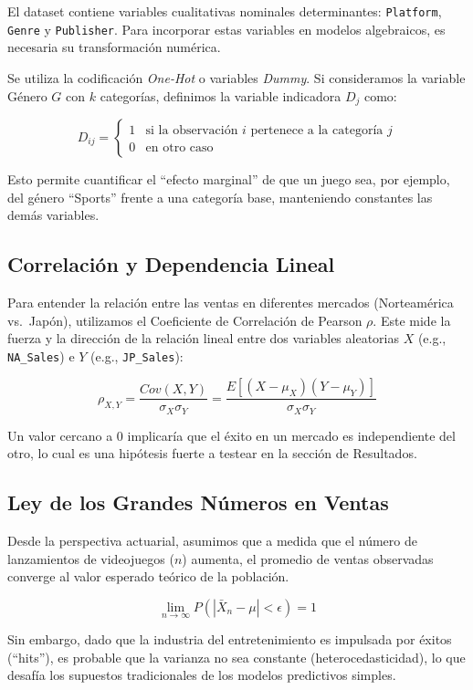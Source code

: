 \documentclass[oneside,11pt]{Latex/Classes/PhDthesisPSnPDF}
\begin{document}
El dataset contiene variables cualitativas nominales determinantes:
\texttt{Platform}, \texttt{Genre} y \texttt{Publisher}. Para incorporar
estas variables en modelos algebraicos, es necesaria su transformación
numérica.

Se utiliza la codificación \emph{One-Hot} o variables \emph{Dummy}. Si
consideramos la variable Género \(G\) con \(k\) categorías, definimos la
variable indicadora \(D_j\) como:

\[
D_{ij} = \begin{cases} 
1 & \text{si la observación } i \text{ pertenece a la categoría } j \\
0 & \text{en otro caso}
\end{cases}
\]

Esto permite cuantificar el ``efecto marginal'' de que un juego sea, por
ejemplo, del género ``Sports'' frente a una categoría base, manteniendo
constantes las demás variables.

\subsection{Correlación y Dependencia Lineal}

Para entender la relación entre las ventas en diferentes mercados
(Norteamérica vs.~Japón), utilizamos el Coeficiente de Correlación de
Pearson \(\rho\). Este mide la fuerza y la dirección de la relación
lineal entre dos variables aleatorias \(X\) (e.g., \texttt{NA\_Sales}) e
\(Y\) (e.g., \texttt{JP\_Sales}):

\[\rho_{X,Y} = \frac{Cov(X,Y)}{\sigma_X \sigma_Y} = \frac{E[(X - \mu_X)(Y - \mu_Y)]}{\sigma_X \sigma_Y}\]

Un valor cercano a 0 implicaría que el éxito en un mercado es
independiente del otro, lo cual es una hipótesis fuerte a testear en la
sección de Resultados.

\subsection{Ley de los Grandes Números en Ventas}

Desde la perspectiva actuarial, asumimos que a medida que el número de
lanzamientos de videojuegos (\(n\)) aumenta, el promedio de ventas
observadas converge al valor esperado teórico de la población.

\[\lim_{n \to \infty} P\left( \left| \bar{X}_n - \mu \right| < \epsilon \right) = 1\]

Sin embargo, dado que la industria del entretenimiento es impulsada por
éxitos (``hits''), es probable que la varianza no sea constante
(heterocedasticidad), lo que desafía los supuestos tradicionales de los
modelos predictivos simples.
\end{document}
